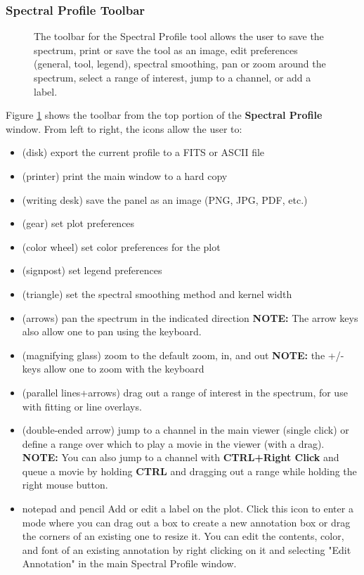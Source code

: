 \subsubsection{Spectral Profile Toolbar}
\label{section:display.image.specprof.toolbar}

\begin{figure}[h!]
\begin{center}
\caption{\label{fig:viewer_spectoolbar} The toolbar for the Spectral Profile tool allows the user to
save the spectrum, print or save the tool as an image, edit
preferences (general, tool, legend), spectral smoothing,
pan or zoom around the spectrum, select a range of interest, jump to a channel, or add a label.}
\hrulefill
\end{center}
\end{figure}

Figure \ref{fig:viewer_spectoolbar} shows the toolbar from the top portion of the {\bf Spectral Profile} 
window. From left to right, the icons allow the user to:

\begin{itemize}
\item (disk) export the current profile to a FITS or ASCII file
\item (printer) print the main window to a hard copy
\item (writing desk) save the panel as an image (PNG, JPG, PDF, etc.)
\item (gear) set plot preferences
\item (color wheel) set color preferences for the plot
\item (signpost) set legend preferences
\item (triangle) set the spectral smoothing method and kernel width
\item (arrows) pan the spectrum in the indicated direction
{\bf NOTE:} The arrow keys also allow one to pan using the keyboard.
\item (magnifying glass) zoom to the default zoom, in, and out
{\bf NOTE:} the +/- keys allow one to zoom with the keyboard
\item (parallel lines+arrows) drag out a range of interest in the spectrum, for use with fitting or line overlays.
\item (double-ended arrow) jump to a channel in the main viewer (single click) or define a range over which to play
a movie in the viewer (with a drag). {\bf NOTE:} You can also jump to a channel with {\bf CTRL+Right Click} and
queue a movie by holding {\bf CTRL} and dragging out a range while holding the right mouse button.
\item {notepad and pencil} Add or edit a label on the plot. Click this icon to enter a mode where you can
drag out a box to create a new annotation box or drag the corners of an existing one to resize it. You can edit 
the contents, color, and font of an existing annotation by right clicking on it and selecting "Edit Annotation"
in the main Spectral Profile window.
\end{itemize}


